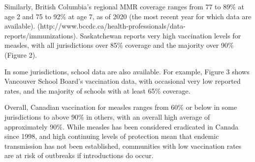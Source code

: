 \documentclass[12pt,a4paper]{article}
\begin{document}
Similarly, British Columbia’s regional MMR coverage ranges from 77 to 89\% at age 2 and 75 to 92\% at age 7, as of 2020 (the most recent year for which data are available). (http://www.bccdc.ca/health-professionals/data-reports/immunizations). Saskatchewan reports very high vaccination levels for measles, with all jurisdictions over 85\% coverage and the majority over 90\% (Figure 2).

In some jurisdictions, school data are also available. For example, Figure 3 shows Vancouver School Board’s vaccination data, with occasional very low reported rates, and the majority of schools with at least 65\% coverage.


Overall, Canadian vaccination for measles ranges from 60\% or below in some jurisdictions to above 90\% in others, with an overall high average of approximately 90\%. While measles has been considered eradicated in Canada since 1998, and high continuing levels of protection mean that endemic transmission has not been established, communities with low vaccination rates are at risk of outbreaks if introductions do occur.

\end{document}
